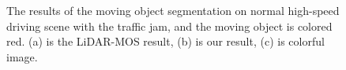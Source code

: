 \documentclass[lettersize,journal]{IEEEtran}
\begin{document}
\begin{figure}[h]
\begin{center}

\caption{The results of the moving object segmentation on  normal high-speed driving scene with the traffic jam, and the moving object is colored red. (a) is the LiDAR-MOS result, (b) is our result, (c) is colorful image.}
\label{fig7}
\end{center}
\end{figure}
\end{document}
